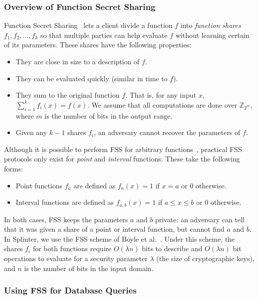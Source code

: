 \subsubsection{Overview of Function Secret Sharing}
\label{sec:fss_overview}
Function Secret Sharing~\cite{fss} lets a client divide
a function $f$ into \textit{function shares} 
$f_1,f_2,\dots,f_k$ so that multiple parties
can help evaluate $f$ without learning certain of its parameters.
These shares have the following properties:

\begin{itemize}
	\item{They are close in size to a description of $f$.}
	\item{They can be evaluated quickly (similar in time to $f$).}
	\item{They sum to the original function $f$.
		That is, for any input $x$, $\sum\limits_{i=1}^k f_i(x) = f(x)$. We 
		assume that all computations are done over $\mathbb{Z}_{2^m}$, 
		where $m$ is the number of bits in the output range. }
	\item{Given any $k-1$ shares $f_i$, an adversary cannot recover the parameters 
		of $f$.}
\end{itemize} 

Although it is possible to perform
FSS for arbitrary functions~\cite{dodis2016spooky}, 
practical FSS protocols only exist for \emph{point} and \emph{interval} functions.
These take the following forms:
\begin{itemize}
	\item Point functions $f_a$ are defined as $f_a(x)=1$ if $x=a$ or 0 otherwise.
	\item Interval functions are defined as $f_{a,b}(x)=1$ if $a \le x \le b$ or 0 otherwise.
\end{itemize}

In both cases, FSS keeps the parameters $a$ and $b$ private: an adversary can tell that
it was given a share of a point or interval function, but cannot find $a$ and $b$.
In Splinter, we use the FSS scheme of Boyle et al.~\cite{fss}.
Under this scheme, the shares $f_i$ for both functions require $O(\lambda n)$ bits to
describe and $O(\lambda n)$ bit operations to evaluate for a security parameter $\lambda$ (the size
of cryptographic keys), and $n$ is the number of bits in the input domain.

\subsubsection{Using FSS for Database Queries}
\label{sec:fss_queries}

